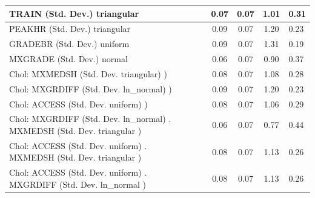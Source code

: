 \begin{table}
\begin{center}
\begin{tabular}{|l|l|c|c|c|l|}
			\hline
			TRAIN (Std. Dev.) triangular &  & 0.07 & 0.07 & 1.01 & 0.31 \\
			\hline
			PEAKHR (Std. Dev.) triangular &  & 0.09 & 0.07 & 1.20 & 0.23 \\
			\hline
			GRADEBR (Std. Dev.) uniform &  & 0.09 & 0.07 & 1.31 & 0.19 \\
			\hline
			MXGRADE (Std. Dev.) normal &  & 0.06 & 0.07 & 0.90 & 0.37 \\
			\hline
			 Chol: MXMEDSH (Std. Dev. triangular) ) &  & 0.08 & 0.07 & 1.08 & 0.28 \\
			\hline
			 Chol: MXGRDIFF (Std. Dev. ln_normal) ) &  & 0.09 & 0.07 & 1.20 & 0.23 \\
			\hline
			 Chol: ACCESS (Std. Dev. uniform) ) &  & 0.08 & 0.07 & 1.06 & 0.29 \\
			\hline
			 Chol: MXGRDIFF (Std. Dev. ln_normal) . MXMEDSH (Std. Dev.   triangular ) &  & 0.06 & 0.07 & 0.77 & 0.44 \\
			\hline
			 Chol: ACCESS (Std. Dev. uniform) . MXMEDSH (Std. Dev.   triangular ) &  & 0.08 & 0.07 & 1.13 & 0.26 \\
			\hline
			 Chol: ACCESS (Std. Dev. uniform) . MXGRDIFF (Std. Dev.   ln_normal ) &  & 0.08 & 0.07 & 1.13 & 0.26 \\
			\hline
		\end{tabular}
	\end{center}
\end{table}